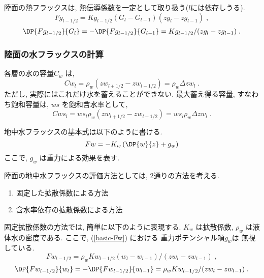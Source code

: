 陸面の熱フラックスは, 熱伝導係数を一定として取り扱う($l$には依存しうる).
\begin{equation}
  Fg_{l-1/2} = Kg_{l-1/2} (G_l - G_{l-1})(zg_l - zg_{l-1}) \; ,
\end{equation}
\begin{equation}
  \DP{Fg_{l-1/2}}{G_l} = - \DP{Fg_{l-1/2}}{G_{l-1}}
 = Kg_{l-1/2}/(zg_l - zg_{l-1}) \; .
\end{equation}

\subsubsection{陸面の水フラックスの計算 }

各層の水の容量$C_w$ は, 
\begin{equation}
  Cw_{l}  = \rho_w (zw_{l+1/2} - zw_{l-1/2}) 
          = \rho_w \Delta zw_{l} \; .
\end{equation}
ただし, 実際にはこれだけ水を蓄えることができない.
最大蓄え得る容量, すなわち飽和容量は, $ws$ を飽和含水率として,
\begin{equation}
  Cws_{l}  = ws_{l} \rho_w (zw_{l+1/2} - zw_{l-1/2})
           = ws_{l} \rho_w \Delta zw_{l} \; .
\end{equation}

地中水フラックスの基本式は以下のように書ける. 
\begin{equation}
  F{w} = - K_{w} \left( \DP{w}{z} + g_w \right)
 \label{basic-Fw}
\end{equation}
ここで, $g_w$ は重力による効果を表す. 

陸面の地中水フラックスの評価方法としては, 2通りの方法を考える.
\begin{enumerate}
\item 固定した拡散係数による方法
\item 含水率依存の拡散係数による方法 
\end{enumerate}

固定拡散係数の方法では, 簡単に以下のように表現する.
$K_w$ は拡散係数, $\rho_w$ は液体水の密度である.
ここで, (\ref{basic-Fw}) における 重力ポテンシャル項$g_w$は
無視している. 
\begin{equation}
  Fw_{l-1/2} = \rho_w Kw_{l-1/2} (w_l - w_{l-1})/(zw_l - zw_{l-1}) \; ,
\end{equation}
\begin{equation}
  \DP{Fw_{l-1/2}}{w_l} = - \DP{Fw_{l-1/2}}{w_{l-1}}
 = \rho_w Kw_{l-1/2}/(zw_l - zw_{l-1}) \; .
\end{equation}

